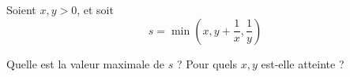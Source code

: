 Soient $x, y > 0$, et soit
$$s = \min\left(x, y + \frac 1 x, \frac 1 y\right)$$

Quelle est la valeur maximale de $s$ ? Pour quels $x, y$ est-elle atteinte ?